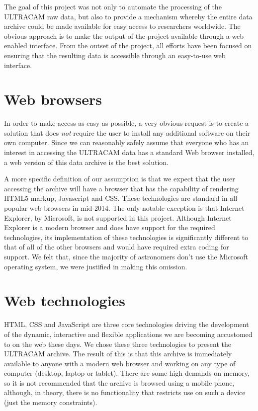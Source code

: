 The goal of this project was not only to automate the processing of the ULTRACAM raw data, but also to provide a mechanism whereby the entire data archive could be made available for easy access to researchers worldwide. The obvious approach is to make the output of the project available through a web enabled interface. From the outset of the project, all efforts have been focused on ensuring that the resulting data is accessible through an easy-to-use web interface. 

\section{Web browsers}
In order to make access as easy as possible, a very obvious request is to create a solution that does \emph{not} require the user to install any additional software on their own computer. Since we can reasonably safely assume that everyone who has an interest in accessing the ULTRACAM data has a standard Web browser installed, a web version of this data archive is the best solution. 

A more specific definition of our assumption is that we expect that the user accessing the archive will have a browser that has the capability of rendering HTML5 markup, Javascript and CSS. These technologies are standard in all popular web browsers in mid-2014. The only notable exception is that Internet Explorer, by Microsoft, is not supported in this project. Although Internet Explorer is a modern browser and does have support for the required technologies, its implementation of these technologies is significantly different to that of all of the other browsers and would have required extra coding for support. We felt that, since the majority of astronomers don't use the Microsoft operating system, we were justified in making this omission.  

\section{Web technologies}
HTML, CSS and JavaScript are three core technologies driving the development of the dynamic, interactive and flexible applications we are becoming accustomed to on the web these days. We chose these three technologies to present the ULTRACAM archive. The result of this is that this archive is immediately available to anyone with a modern web browser and working on any type of computer (desktop, laptop or tablet). There are some high demands on memory, so it is not recommended that the archive is browsed using a mobile phone, although, in theory, there is no functionality that restricts use on such a device (just the memory constraints). 

